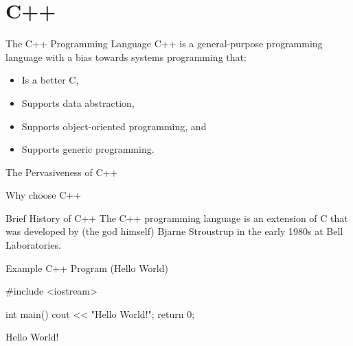 \documentclass[../lecture1-introduction.tex]{subfiles}
\begin{document}
\section{C++}


\begin{frame}[fragile]{The C++ Programming Language}
    C++ is a general-purpose programming language with a bias towards systems
    programming that:
    \begin{itemize}
        \item Is a better C,
        \item Supports data abstraction,
        \item Supports object-oriented programming, and
        \item Supports generic programming.
    \end{itemize}
\end{frame}


\begin{frame}[fragile]{The Pervasiveness of C++}



\end{frame}


\begin{frame}[fragile]{Why choose C++}



\end{frame}


\begin{frame}[fragile]{Brief History of C++}
    The C++ programming language is an extension of C that was developed by
    (the god himself) Bjarne Stroustrup in the early 1980s at Bell Laboratories.
\end{frame}


\begin{frame}[fragile]{Example C++ Program (Hello World)}
    \begin{cppcode}[]
#include <iostream>

int main()
{
    cout << "Hello World!";
    return 0;
}
    \end{cppcode}

    \begin{commandshell}
Hello World!
    \end{commandshell}
\end{frame}

\end{document}
